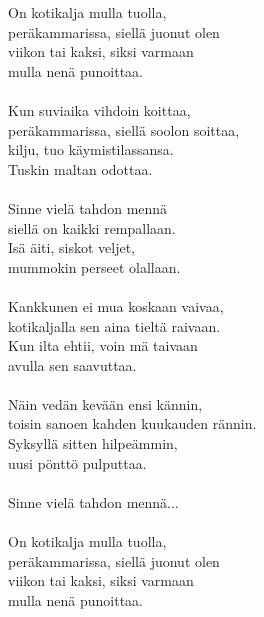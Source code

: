 
On kotikalja mulla tuolla, \\ peräkammarissa, siellä juonut olen \\ viikon tai kaksi, siksi varmaan \\ mulla nenä punoittaa. \\ \hspace{10mm} \\ Kun suviaika vihdoin koittaa, \\ peräkammarissa, siellä soolon soittaa, \\ kilju, tuo käymistilassansa. \\ Tuskin maltan odottaa. \\ \hspace{10mm} \\ Sinne vielä tahdon mennä \\ siellä on kaikki rempallaan. \\ Isä äiti, siskot veljet, \\ mummokin perseet olallaan. \\ \hspace{10mm} \\ Kankkunen ei mua koskaan vaivaa, \\ kotikaljalla sen aina tieltä raivaan. \\ Kun ilta ehtii, voin mä taivaan \\ avulla sen saavuttaa. \\ \hspace{10mm} \\ Näin vedän kevään ensi kännin, \\ toisin sanoen kahden kuukauden rännin. \\ Syksyllä sitten hilpeämmin, \\ uusi pönttö pulputtaa. \\ \hspace{10mm} \\ Sinne vielä tahdon mennä... \\ \hspace{10mm} \\ On kotikalja mulla tuolla, \\ peräkammarissa, siellä juonut olen \\ viikon tai kaksi, siksi varmaan \\ mulla nenä punoittaa.